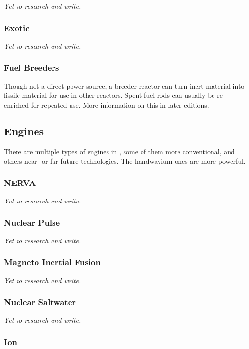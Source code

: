 \textit{Yet to research and write.}

\subsubsection{Exotic}

\textit{Yet to research and write.}

\subsubsection{Fuel Breeders}

Though not a direct power source, a breeder reactor can turn inert material into fissile material for use in other reactors. Spent fuel rods can usually be re-enriched for repeated use. More information on this in later editions.

\subsection{Engines}

There are multiple types of engines in \getTitle , some of them more conventional, and others near- or far-future technologies. The handwavium ones are more powerful.

\subsubsection{NERVA}

\textit{Yet to research and write.}

\subsubsection{Nuclear Pulse}

\textit{Yet to research and write.}

\subsubsection{Magneto Inertial Fusion}

\textit{Yet to research and write.}

\subsubsection{Nuclear Saltwater}

\textit{Yet to research and write.}

\subsubsection{Ion}

